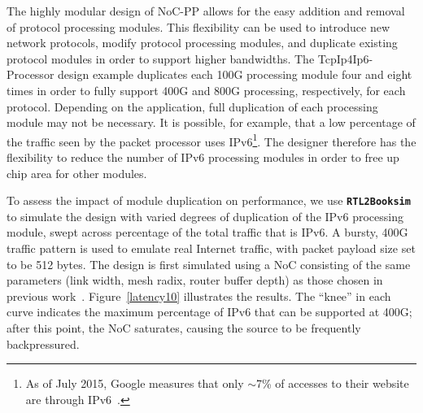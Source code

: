 The highly modular design of NoC-PP allows for the easy addition and removal of protocol processing modules.
This flexibility can be used to introduce new network protocols, modify protocol processing modules, and duplicate existing protocol modules in order to support higher bandwidths.
The TcpIp4Ip6-Processor design example duplicates each 100G processing module four and eight times in order to fully support 400G and 800G processing, respectively, for each protocol.
Depending on the application, full duplication of each processing module may not be necessary.
It is possible, for example, that a low percentage of the traffic seen by the packet processor uses IPv6\footnote{As of July 2015, Google measures that only $\sim$7\% of accesses to their website are through IPv6~\cite{google_ipv6}.}.
The designer therefore has the flexibility to reduce the number of IPv6 processing modules in order to free up chip area for other modules.

To assess the impact of module duplication on performance, we use \textbf{\texttt{RTL2Booksim}} to simulate the design with varied degrees of duplication of the IPv6 processing module, swept across percentage of the total traffic that is IPv6.
A bursty, 400G traffic pattern is used to emulate real Internet traffic, with packet payload size set to be 512 bytes.
The design is first simulated using a NoC consisting of the same parameters (link width, mesh radix, router buffer depth) as those chosen in previous work~\cite{abdelfattah2015take}.
Figure~\ref{latency10} illustrates the results.
The ``knee'' in each curve indicates the maximum percentage of IPv6 that can be supported at 400G; after this point, the NoC saturates, causing the source to be frequently backpressured.



